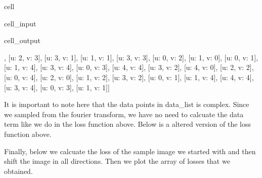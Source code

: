 \documentclass[letterpaper,10pt,english]{jupyterBook}
\begin{document}
\begin{sphinxuseclass}{cell}\begin{sphinxVerbatimInput}

\begin{sphinxuseclass}{cell_input}
\begin{sphinxVerbatim}[commandchars=\\\{\}]
   
\end{sphinxVerbatim}

\end{sphinxuseclass}\end{sphinxVerbatimInput}
\begin{sphinxVerbatimOutput}

\begin{sphinxuseclass}{cell_output}
\begin{sphinxVerbatim}[commandchars=\\\{\}]
[[u: 1, v: \PYGZhy{}2],
 [u: \PYGZhy{}2, v: \PYGZhy{}3],
 [u: \PYGZhy{}3, v: 1],
 [u: 1, v: \PYGZhy{}1],
 [u: \PYGZhy{}3, v: \PYGZhy{}3],
 [u: 0, v: 2],
 [u: 1, v: 0],
 [u: 0, v: \PYGZhy{}1],
 [u: \PYGZhy{}1, v: 4],
 [u: \PYGZhy{}3, v: 4],
 [u: 0, v: 3],
 [u: \PYGZhy{}4, v: \PYGZhy{}4],
 [u: 3, v: \PYGZhy{}2],
 [u: 4, v: 0],
 [u: \PYGZhy{}2, v: \PYGZhy{}2],
 [u: 0, v: 4],
 [u: 2, v: 0],
 [u: 1, v: 2],
 [u: \PYGZhy{}3, v: 2],
 [u: 0, v: 1],
 [u: \PYGZhy{}1, v: 4],
 [u: 4, v: 4],
 [u: \PYGZhy{}3, v: 4],
 [u: 0, v: \PYGZhy{}3],
 [u: \PYGZhy{}1, v: 1]]
\end{sphinxVerbatim}

\end{sphinxuseclass}\end{sphinxVerbatimOutput}

\end{sphinxuseclass}
\sphinxAtStartPar
It is important to note here that the data points in data\_list is complex. Since we sampled from the fourier transform, we have no need to calcuate the data term like we do in the loss function above. Below is a altered version of the loss function above.

\sphinxAtStartPar
Finally, below we calcuate the loss of the sample image we started with and then shift the image in all directions. Then we plot the array of losses that we obtained.
\end{document}

